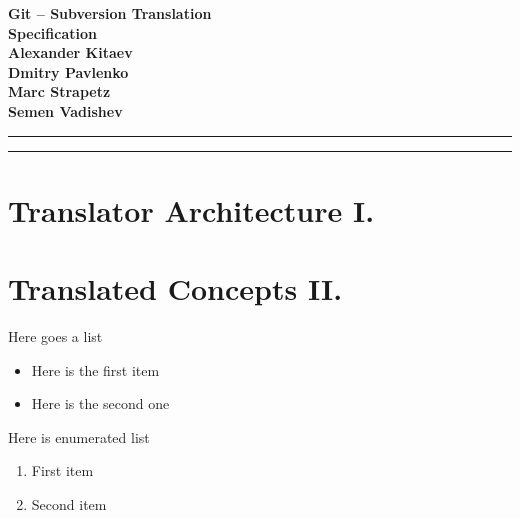 \documentclass[aps,%
12pt,%
final,%
oneside,
onecolumn,%
superscriptaddress,%
centertags]{article} %
\begin{document}
\begin{titlepage}
\begin{center}

\textbf{\LARGE Git – Subversion Translation} \\[1.0cm]
\textbf{\LARGE Specification} \\[3.0cm]

\textbf{Alexander Kitaev} \\[0.7cm]
\textbf{Dmitry Pavlenko} \\[0.7cm]
\textbf{Marc Strapetz} \\[0.7cm]
\textbf{Semen Vadishev} \\[0.7cm]

\end{center}
\end{titlepage}

\topmargin=-10pt
\setcounter{page}{2}

\newpage
\hrule
\tableofcontents

\newpage
\hrule
\section{Translator Architecture I.}





\section{Translated Concepts II.}







\newpage

Here goes a list\newline %
\begin{itemize}
	\item Here is the first item
	\item Here is the second one
\end{itemize}

Here is enumerated list\\ %
\begin{enumerate}
	\item First item
	\item Second item
\end{enumerate}
\end{document}
